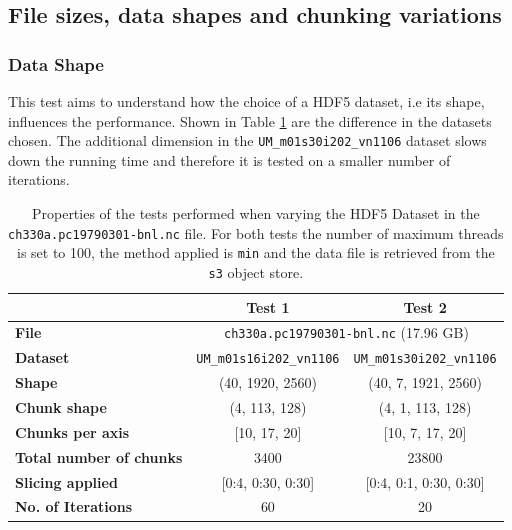 \documentclass{article}
\begin{document}
\subsection{File sizes, data shapes and chunking variations}
\subsubsection{Data Shape}
This test aims to understand how the choice of a HDF5 dataset, i.e its shape, influences the performance. Shown in Table \ref{tab:T1T2_Conditions} are the difference in the datasets chosen. The additional dimension in the \texttt{UM\_m01s30i202\_vn1106} dataset slows down the running time and therefore it is tested on a smaller number of iterations. 
\begin{table}[h!] 
    \centering 
    \begin{tabular}{lcc}  \hline
                                        & Test 1                            & Test 2                              \\ \hline
        \textbf{File}                   & \multicolumn{2}{c}{ \texttt{ch330a.pc19790301-bnl.nc}  (17.96  GB)}     \\                                       
        \textbf{Dataset}                &\texttt{UM\_m01s16i202\_vn1106}    & \texttt{UM\_m01s30i202\_vn1106}     \\ 
        \textbf{Shape}                  & (40, 1920, 2560)                  & (40, 7, 1921, 2560)                 \\ 
        \textbf{Chunk shape}            & (4, 113, 128)                     & (4, 1, 113, 128)                    \\ 
        \textbf{Chunks per axis}        & [10, 17, 20]                      & [10, 7, 17, 20]                     \\ 
        \textbf{Total number of chunks} & 3400                              &   23800                             \\ 
        \textbf{Slicing applied}        & [0:4, 0:30, 0:30]                 &[0:4, 0:1, 0:30, 0:30]               \\ 
        \textbf{No. of Iterations}      & 60                                & 20                                  \\  \hline
    \end{tabular} 
    \caption{Properties of the tests performed when varying the HDF5 Dataset in the \texttt{ch330a.pc19790301-bnl.nc} file. For both tests the number of maximum threads is set to 100, the method applied is \texttt{min} and the data file is retrieved from the \texttt{s3} object store.} 
    \label{tab:T1T2_Conditions} 
\end{table}
\end{document}
